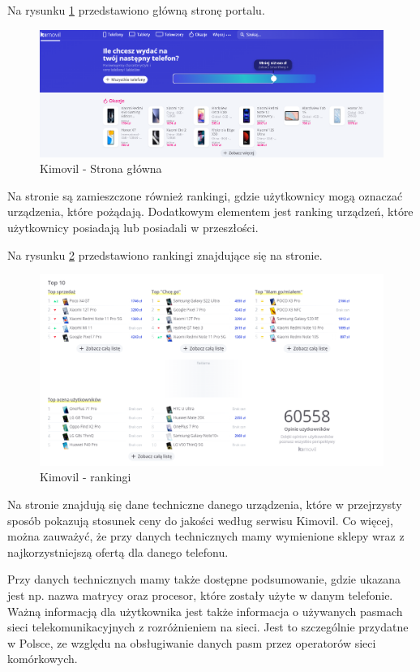 Na rysunku \ref*{kimovil_1} przedstawiono główną stronę portalu.
\begin{figure}[H]
    \centering
    \includegraphics[scale=0.36]{img/Kimovil/kimovil.png}
    \caption{Kimovil - Strona główna}
    \label{kimovil_1}
\end{figure}
Na stronie są zamieszczone również rankingi, gdzie użytkownicy mogą oznaczać urządzenia, które pożądają. Dodatkowym elementem jest ranking urządzeń, które użytkownicy posiadają lub posiadali w przeszłości.

Na rysunku \ref*{kimovil_2} przedstawiono rankingi znajdujące się na stronie.
\begin{figure}[H]
    \centering
    \includegraphics[scale=0.448]{img/Kimovil/rankingsKimovil.png}
    \caption{Kimovil - rankingi}
    \label{kimovil_2}
\end{figure}
Na stronie znajdują się dane techniczne danego urządzenia, które w przejrzysty sposób pokazują stosunek ceny do jakości według serwisu Kimovil. Co więcej, można zauważyć, że przy danych technicznych mamy wymienione sklepy wraz z najkorzystniejszą ofertą dla danego telefonu. 

Przy danych technicznych mamy także dostępne podsumowanie, gdzie ukazana jest np. nazwa matrycy oraz procesor, które zostały użyte w danym telefonie. Ważną informacją dla użytkownika jest także informacja o używanych pasmach sieci telekomunikacyjnych z rozróżnieniem na sieci. Jest to szczególnie przydatne w Polsce, ze względu na obsługiwanie danych pasm przez operatorów sieci komórkowych.


